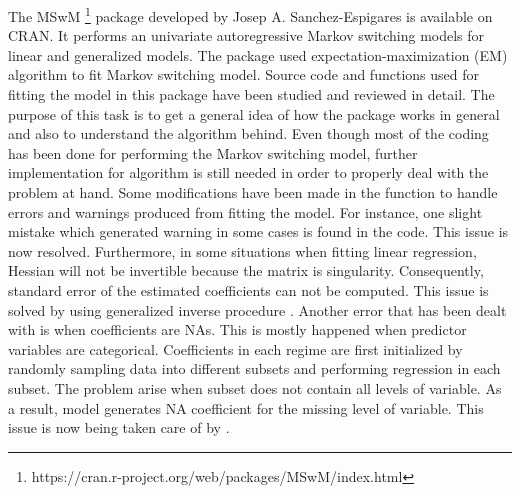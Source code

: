 \documentclass[]{article}
\begin{document}
The MSwM \footnote{https://cran.r-project.org/web/packages/MSwM/index.html} package developed by Josep A. Sanchez-Espigares is available on CRAN. It performs an univariate autoregressive Markov switching models for linear and generalized models. The package used expectation-maximization (EM) algorithm to fit Markov switching model. Source code and functions used for fitting the model in this package have been studied and reviewed in detail. The purpose of this task is to get a general idea of how the package works in general and also to understand the algorithm behind. Even though most of the coding has been done for performing the Markov switching model, further implementation for algorithm is still needed in order to properly deal with the problem at hand. Some modifications have been made in the function to handle errors and warnings produced from fitting the model. For instance, one slight mistake which generated warning in some cases is found in the code. This issue is now resolved. Furthermore, in some situations when fitting linear regression, Hessian will not be invertible because the matrix is singularity. Consequently, standard error of the estimated coefficients can not be computed. This issue is solved by using generalized inverse procedure \cite{gill2004your}. Another error that has been dealt with is when coefficients are NAs. This is mostly happened when predictor variables are categorical. Coefficients in each regime are first initialized by randomly sampling data into different subsets and performing regression in each subset. The problem arise when subset does not contain all levels of variable. As a result, model generates NA coefficient for the missing level of variable. This issue is now being taken care of by . 



\end{document}
